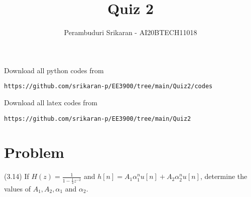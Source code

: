\documentclass[journal,12pt,twocolumn]{IEEEtran}
\begin{document}
\makeatletter
{}
\makeatother
\let\StandardTheFigure\thefigure
\let\vec\mathbf
\renewcommand{\thefigure}{\theproblem}
\def\putbox#1#2#3{\makebox[0in][l]{\makebox[#1][l]{}\raisebox{\baselineskip}[0in][0in]{\raisebox{#2}[0in][0in]{#3}}}}
     \def\rightbox#1{\makebox[0in][r]{#1}}
     \def\centbox#1{\makebox[0in]{#1}}
     \def\topbox#1{\raisebox{-\baselineskip}[0in][0in]{#1}}
     \def\midbox#1{\raisebox{-0.5\baselineskip}[0in][0in]{#1}}
\vspace{3cm}
\title{Quiz 2}
\author{Perambuduri Srikaran - AI20BTECH11018}
\maketitle
\newpage
\bigskip
\renewcommand{\thefigure}{\theenumi}
\renewcommand{\thetable}{\theenumi}
Download all python codes from
\begin{lstlisting}
https://github.com/srikaran-p/EE3900/tree/main/Quiz2/codes
\end{lstlisting}
Download all latex codes from
\begin{lstlisting}
https://github.com/srikaran-p/EE3900/tree/main/Quiz2
\end{lstlisting}
\section*{Problem}
(3.14) If $H(z) = \frac{1}{1 - \frac{1}{4}z^{-2}}$ and $h[n] = A_1\alpha_1^nu[n] + A_2\alpha_2^nu[n]$, determine the values of $A_1, A_2, \alpha_1$ and $\alpha_2$.
\end{document}

